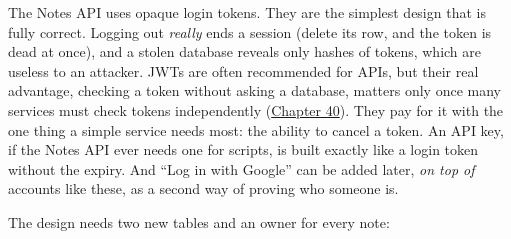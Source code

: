 The Notes API uses opaque login tokens. They are the simplest design that is fully correct. Logging out \emph{really} ends a session (delete its row, and the token is dead at once), and a stolen database reveals only hashes of tokens, which are useless to an attacker. JWTs are often recommended for APIs, but their real advantage, checking a token without asking a database, matters only once many services must check tokens independently (\hyperref[ch:40-distributed-systems]{Chapter 40}). They pay for it with the one thing a simple service needs most: the ability to cancel a token. An API key, if the Notes API ever needs one for scripts, is built exactly like a login token without the expiry. And ``Log in with Google'' can be added later, \emph{on top of} accounts like these, as a second way of proving who someone is.

The design needs two new tables and an owner for every note:

